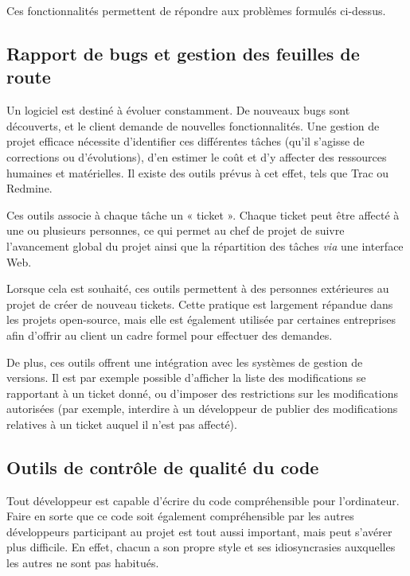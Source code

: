 
Ces fonctionnalités permettent de répondre aux problèmes formulés ci-dessus.

\subsection{Rapport de bugs et gestion des feuilles de route}

Un logiciel est destiné à évoluer constamment. De nouveaux bugs sont découverts, et le client demande de nouvelles fonctionnalités. Une gestion de projet efficace nécessite d’identifier ces différentes tâches (qu’il s’agisse de corrections ou d’évolutions), d’en estimer le coût et d’y affecter des ressources humaines et matérielles. Il existe des outils prévus à cet effet, tels que Trac ou Redmine.

Ces outils associe à chaque tâche un « ticket ». Chaque ticket peut être affecté à une ou plusieurs personnes, ce qui permet au chef de projet de suivre l’avancement global du projet ainsi que la répartition des tâches \textit{via} une interface Web.

Lorsque cela est souhaité, ces outils permettent à des personnes extérieures au projet de créer de nouveau tickets. Cette pratique est largement répandue dans les projets open-source, mais elle est également utilisée par certaines entreprises afin d’offrir au client un cadre formel pour effectuer des demandes.

De plus, ces outils offrent une intégration avec les systèmes de gestion de versions. Il est par exemple possible d’afficher la liste des modifications se rapportant à un ticket donné, ou d’imposer des restrictions sur les modifications autorisées (par exemple, interdire à un développeur de publier des modifications relatives à un ticket auquel il n’est pas affecté).

\subsection{Outils de contrôle de qualité du code}

Tout développeur est capable d’écrire du code compréhensible pour l’ordinateur. Faire en sorte que ce code soit également compréhensible par les autres développeurs participant au projet est tout aussi important, mais peut s’avérer plus difficile. En effet, chacun a son propre style et ses idiosyncrasies auxquelles les autres ne sont pas habitués.

